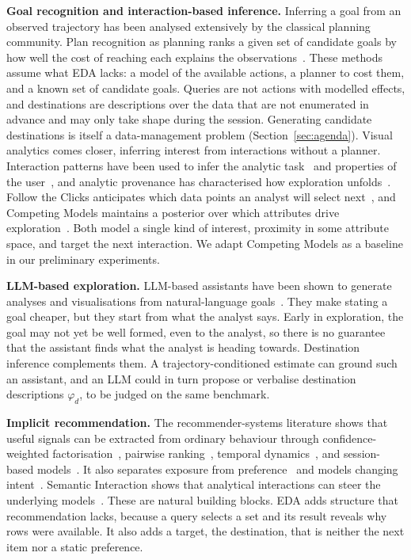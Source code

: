 \documentclass[sigconf]{acmart}
\begin{document}
\textbf{Goal recognition and interaction-based inference.}
Inferring a goal from an observed trajectory has been analysed extensively by the classical planning community. Plan recognition as planning ranks a given set of candidate goals by how well the cost of reaching each explains the observations~\cite{ramirezPlanRecognitionPlanning2009,ramirezProbabilisticPlanRecognition2010,mastersCostbasedGoalRecognition2019}. These methods assume what EDA lacks: a model of the available actions, a planner to cost them, and a known set of candidate goals. Queries are not actions with modelled effects, and destinations are descriptions over the data that are not enumerated in advance and may only take shape during the session. Generating candidate destinations is itself a data-management problem (Section~\ref{sec:agenda}). Visual analytics comes closer, inferring interest from interactions without a planner. Interaction patterns have been used to infer the analytic task~\cite{gotz2009behavior} and properties of the user~\cite{brown2014waldo}, and analytic provenance has characterised how exploration unfolds~\cite{battleCharacterizingExploratoryVisual2019}. Follow the Clicks anticipates which data points an analyst will select next~\cite{ottley2019clicks}, and Competing Models maintains a posterior over which attributes drive exploration~\cite{monadjemi2021competing}. Both model a single kind of interest, proximity in some attribute space, and target the next interaction. We adapt Competing Models as a baseline in our preliminary experiments.

\textbf{LLM-based exploration.}
LLM-based assistants have been shown to generate analyses and visualisations from natural-language goals~\cite{dibia2023lida,ma2023insightpilot}. They make stating a goal cheaper, but they start from what the analyst says. Early in exploration, the goal may not yet be well formed, even to the analyst, so there is no guarantee that the assistant finds what the analyst is heading towards. Destination inference complements them. A trajectory-conditioned estimate can ground such an assistant, and an LLM could in turn propose or verbalise destination descriptions $\varphi_d$, to be judged on the same benchmark.

\textbf{Implicit recommendation.}
The recommender-systems literature shows that useful signals can be extracted from ordinary behaviour through confidence-weighted factorisation~\cite{hu2008collaborative}, pairwise ranking~\cite{rendle2009bpr}, temporal dynamics~\cite{koren2009collaborative}, and session-based models~\cite{hidasi2016session}. It also separates exposure from preference~\cite{liang2016exposure,lin2024recrec} and models changing intent~\cite{wang2018modeling}. Semantic Interaction shows that analytical interactions can steer the underlying models~\cite{endert2012semantic}. These are natural building blocks. EDA adds structure that recommendation lacks, because a query selects a set and its result reveals why rows were available. It also adds a target, the destination, that is neither the next item nor a static preference.
\end{document}
